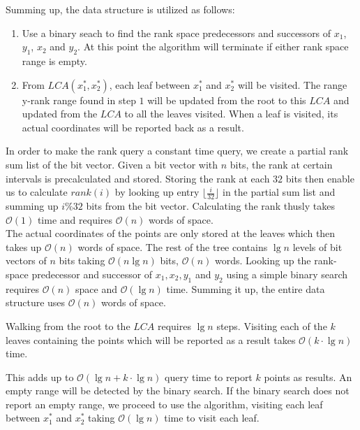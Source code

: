 Summing up, the data structure is utilized as follows:
\begin{enumerate}
    \item Use a binary seach to find the rank space predecessors and successors of $x_1$, $y_1$, $x_2$ and $y_2$. At this point the algorithm will terminate if either rank space range is empty.
    \item From $LCA(x^*_1, x^*_2)$, each leaf between $x^*_1$ and $x^*_2$ will be visited. The range y-rank range found in step $1$ will be updated from the root to this $LCA$ and updated from the $LCA$ to all the leaves visited. When a leaf is visited, its actual coordinates will be reported back as a result.
\end{enumerate}

In order to make the rank query a constant time query, we create a partial rank sum list of the bit vector. Given a bit vector with $n$ bits, the rank at certain intervals is precalculated and stored. Storing the rank at each $32$ bits then enable us to calculate $rank(i)$ by looking up entry $\lfloor \frac{i}{32} \rfloor$ in the partial sum list and summing up $i\% 32$ bits from the bit vector. Calculating the rank thusly takes $\mathcal{O}(1)$ time and requires $\mathcal{O}(n)$ words of space.  \\

The actual coordinates of the points are only stored at the leaves which then takes up $\mathcal{O}(n)$  words of space. The rest of the tree contains $\lg n$ levels of bit vectors of $n$ bits taking $\mathcal{O}(n \lg n)$ bits, $\mathcal{O}(n)$ words. Looking up the rank-space predecessor and successor of $x_1, x_2, y_1$ and $y_2$ using a simple binary search requires $\mathcal{O}(n)$ space and $\mathcal{O}(\lg n)$ time. Summing it up, the entire data structure uses $\mathcal{O}(n)$ words of space. 

Walking from the root to the $LCA$ requires $\lg n$ steps. Visiting each of the $k$ leaves containing the points which will be reported as a result takes $\mathcal{O}(k \cdot \lg n)$ time.

This adds up to $\mathcal{O}(\lg n + k\cdot\lg n)$ query time to report $k$ points as results. An empty range will be detected by the binary search. If the binary search does not report an empty range, we proceed to use the algorithm, visiting each leaf between $x^*_1$ and $x^*_2$ taking $\mathcal{O}(\lg n)$ time to visit each leaf. \\

